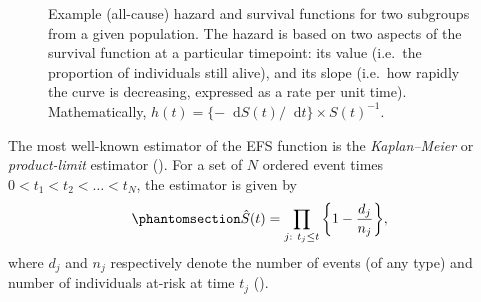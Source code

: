 \documentclass[
  letterpaper,
  paper=240mm:170mm,
  twoside=true,
  open=right,
  fontsize=10pt,
  pagesize=false,
  BCOR=15mm,
  DIV=14,
  headinclude=true,
  footinclude=false,
  headsepline=on]{scrbook}
\newcommand\diff{\mathop{}\!\mathrm{d}}
\begin{document}
\begin{figure}


\caption{\label{fig-intro-haz}Example (all-cause) hazard and survival
functions for two subgroups from a given population. The hazard is based
on two aspects of the survival function at a particular timepoint: its
value (i.e.~the proportion of individuals still alive), and its slope
(i.e.~how rapidly the curve is decreasing, expressed as a rate per unit
time). Mathematically,
\(h(t) = \{-\diff S(t)/\diff t\} \times S(t)^{-1}\).}

\end{figure}%

The most well-known estimator of the EFS function is the
\emph{Kaplan--Meier} or \emph{product-limit} estimator
(). For a set of \(N\) ordered event times
\(0 < t_1 < t_2 < \dots < t_N\), the estimator is given by
\begin{equation}\phantomsection\label{eq-kaplan}{
\hat{S}(t) = \prod_{j:\ t_j \leq t} \bigg\{1 - \frac{d_j}{n_j}\bigg\},
}\end{equation} where \(d_j\) and \(n_j\) respectively denote the number
of events (of any type) and number of individuals at-risk at time
\(t_j\) ().
\end{document}
